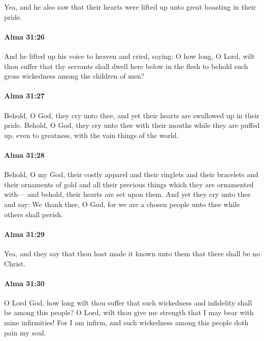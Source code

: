 			Yea, and he also saw
			that their hearts were lifted up unto great boasting in their pride.

		\paragraph{Alma 31:26} %
			\label{ALMA-31-26}

			And he lifted up his voice to heaven and cried, saying:
			O how long, O Lord, wilt thou suffer
			that thy servants shall dwell here below in the flesh
			to behold such gross wickedness among the children of men?

		\paragraph{Alma 31:27} %
			\label{ALMA-31-27}

			Behold, O God, they cry unto thee,
			and yet their hearts are swallowed up in their pride.
			Behold, O God, they cry unto thee with their mouths
			while they are puffed up, even to greatness, with the vain things of the world.

		\paragraph{Alma 31:28} %
			\label{ALMA-31-28}

			Behold, O my God, their costly apparel
			and their ringlets and their bracelets and their ornaments of gold
			and all their precious things which they are ornamented with---
			and behold, their hearts are set upon them.
			And yet they cry unto thee and say:
			We thank thee, O God,
			for we are a chosen people unto thee while others shall perish.

		\paragraph{Alma 31:29} %
			\label{ALMA-31-29}

			Yea, and they say that thou hast made it known unto them
			that there shall be no Christ.

		\paragraph{Alma 31:30} %
			\label{ALMA-31-30}

			O Lord God, how long wilt thou suffer
			that such wickedness and infidelity shall be among this people?
			O Lord, wilt thou give me strength that I may bear with mine infirmities!
			For I am infirm, and such wickedness among this people doth pain my soul.

